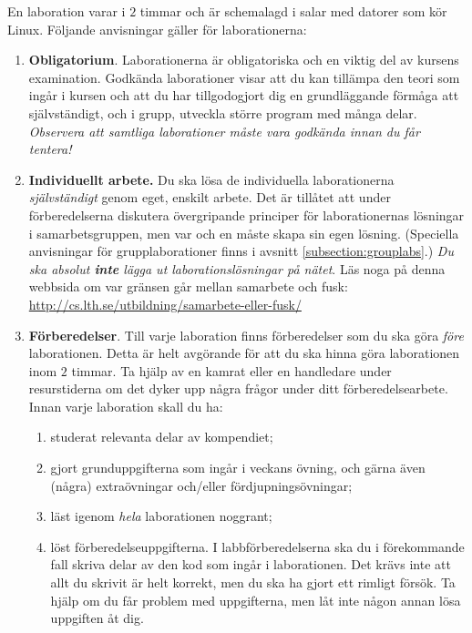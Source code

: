 En laboration varar i  $2$ timmar och är schemalagd i salar med datorer som kör Linux. Följande anvisningar gäller för laborationerna:

\begin{enumerate}

\item \textbf{Obligatorium}. Laborationerna är obligatoriska och en viktig del av kursens examination. Godkända laborationer visar att du kan tillämpa den teori som ingår i kursen och att du har tillgodogjort dig en grundläggande förmåga att självständigt, och i grupp, utveckla större program med många delar.  \emph{Observera att samtliga laborationer måste vara godkända innan du får tentera!}

\item  \textbf{Individuellt arbete.} Du ska lösa de individuella laborationerna \emph{självständigt} genom eget, enskilt arbete. Det är tillåtet att under förberedelserna diskutera övergripande principer för laborationernas lösningar i samarbetsgruppen, men var och en måste skapa sin egen lösning. (Speciella anvisningar för grupplaborationer finns i avsnitt \ref{subsection:grouplabs}.) \emph{Du ska absolut \textbf{inte} lägga ut laborationslösningar på nätet}. Läs noga på denna webbsida om var gränsen går mellan samarbete och fusk: \url{http://cs.lth.se/utbildning/samarbete-eller-fusk/}

\item \textbf{Förberedelser}. Till varje laboration finns förberedelser som du ska göra \emph{före} laborationen. Detta är helt avgörande för att du ska hinna göra laborationen inom $2$ timmar. Ta hjälp av en kamrat eller en handledare under resurstiderna om det dyker upp några frågor under ditt förberedelsearbete. Innan varje laboration skall du ha:

\begin{enumerate}
\item studerat relevanta delar av kompendiet;
\item gjort grunduppgifterna som ingår i veckans övning, och gärna även (några) extraövningar och/eller fördjupningsövningar;
\item läst igenom \emph{hela} laborationen noggrant;
\item löst förberedelseuppgifterna. I labbförberedelserna ska du i förekommande fall skriva delar av den kod som ingår i laborationen. Det krävs inte att allt du skrivit är helt korrekt, men du ska ha gjort ett rimligt försök. Ta hjälp om du får problem med uppgifterna, men låt inte någon annan lösa uppgiften åt dig.
\end{enumerate}


\end{enumerate}
